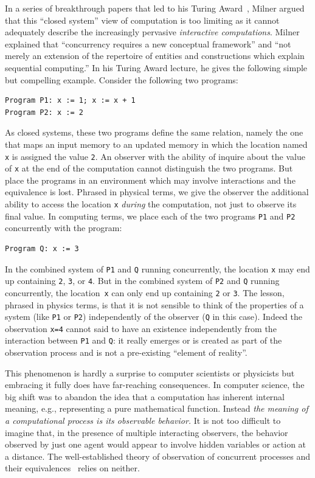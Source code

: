 \documentclass{article}
\theoremstyle{remark}
\begin{document}
In a series of breakthrough papers that led to his Turing
Award~\cite{Milner:1993:EIT:151233.151240}, Milner argued that this
``closed system'' view of computation is too limiting as it cannot
adequately describe the increasingly pervasive \emph{interactive
  computations}. Milner explained that ``concurrency requires a new
conceptual framework'' and ``not merely an extension of the repertoire
of entities and constructions which explain sequential computing.'' In
his Turing Award lecture, he gives the following simple but compelling
example. Consider the following two programs:
\begin{verbatim}
Program P1: x := 1; x := x + 1 
Program P2: x := 2
\end{verbatim}
As closed systems, these two programs define the same relation, namely
the one that maps an input memory to an updated memory in which the
location named \verb|x| is assigned the value \verb|2|. An observer
with the ability of inquire about the value of \verb|x| at the end of
the computation cannot distinguish the two programs. But place the
programs in an environment which may involve interactions and the
equivalence is lost. Phrased in physical terms, we give the observer the
additional ability to access the location \verb|x| \emph{during} the
computation, not just to observe its final value. In computing terms,
we place each of the two programs \verb|P1| and \verb|P2| concurrently
with the program:
\begin{verbatim}
Program Q: x := 3
\end{verbatim}
In the combined system of \verb|P1| and \verb|Q| running concurrently,
the location \verb|x| may end up containing \verb|2|, \verb|3|, or
\verb|4|. But in the combined system of \verb|P2| and \verb|Q| running
concurrently, the location~\verb|x| can only end up containing
\verb|2| or \verb|3|. The lesson, phrased in physics terms, is that it
is not sensible to think of the properties of a system (like \verb|P1|
or \verb|P2|) independently of the observer (\verb|Q| in this
case). Indeed the observation \verb|x=4| cannot said to have an
existence independently from the interaction between \verb|P1| and
\verb|Q|: it really emerges or is created as part of the observation
process and is not a pre-existing ``element of reality''.

This phenomenon is hardly a surprise to computer scientists or
physicists but embracing it fully does have far-reaching
consequences. In computer science, the big shift was to abandon the
idea that a computation has inherent internal meaning, e.g.,
representing a pure mathematical function. Instead \emph{the meaning
  of a computational process is its observable behavior.} It is not
too difficult to imagine that, in the presence of multiple interacting
observers, the behavior observed by just one agent would appear to
involve hidden variables or action at a distance. The well-established
theory of observation of concurrent processes and their
equivalences~\cite{Hennessy1989} relies on neither.
\end{document}
